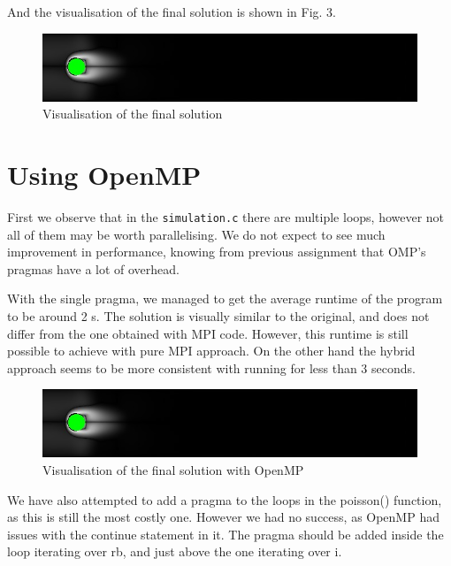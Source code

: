 \documentclass[11pt,journal]{article}
\begin{document}
	
	And the visualisation of the final solution is shown in Fig. 3.
	\begin{figure}[h]
		\centering
		\includegraphics[scale=0.7]{karman_final7.jpg}
		\caption{Visualisation of the final solution}
	\end{figure}

	\section{Using OpenMP}
	First we observe that in the \texttt{simulation.c} there are multiple loops, however not all of them may be worth parallelising. We do not expect to see much improvement in performance, knowing from previous assignment that OMP's pragmas have a lot of overhead.
	
	With the single pragma, we managed to get the average runtime of the program to be around 2 s. The solution is visually similar to the original, and does not differ from the one obtained with MPI code. However, this runtime is still possible to achieve with pure MPI approach. On the other hand the hybrid approach seems to be more consistent with running for less than 3 seconds.
	
	\begin{figure}[h]
		\centering
		\includegraphics[scale=0.7]{karman_omp2.jpg}
		\caption{Visualisation of the final solution with OpenMP}
	\end{figure}

	We have also attempted to add a pragma to the loops in the poisson() function, as this is still the most costly one. However we had no success, as OpenMP had issues with the continue statement in it. The pragma should be added inside the loop iterating over rb, and just above the one iterating over i.
	

\end{document}
